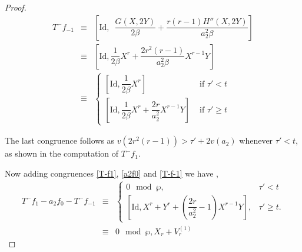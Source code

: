 \documentclass[11pt, reqno]{amsart}
\numberwithin{equation}{section}
\theoremstyle{definition}
\theoremstyle{remark}
\theoremstyle{definition}
\theoremstyle{remark}
\theoremstyle{remark}
\begin{document}
\begin{proof}
\begin{eqnarray}
T^-f_{-1} & \equiv&
\left[\mathrm{Id},\enspace\dfrac{G(X,2Y)}{2\beta}+\dfrac{r(r-1)H''(X,2Y)}{a_2^2\beta}\right]\nonumber\\
  &\equiv& \left[\mathrm{Id},\dfrac{1}{2\beta}X^r+\dfrac{2r^2(r-1)}{a_2^2\beta}X^{r-1}Y\right] \nonumber\\  & \equiv & \begin{cases}
      \left[\mathrm{Id},\dfrac{1}{2\beta}X^r\right] &  \text{ if }\tau'<t \\
\left[\mathrm{Id},\dfrac{1}{2\beta}X^r+\dfrac{2r}{a_2^2}X^{r-1}Y\right]& \text{ if }\tau'\geq t
  \end{cases}
  \end{eqnarray}
  
The last congruence follows as $v(2r^2(r-1))>\tau'+2v(a_2)$ whenever $\tau'<t$, as shown in the computation of $T^-f_{1}$. 

Now adding congruences \eqref{T-f1}, \eqref{a2f0} and \eqref{T-f-1} we have ,
\begin{eqnarray}
   T^-f_1-a_2f_0-T^-f_{-1}&\equiv&
   \begin{cases}
       0\mod\wp, &\tau'<t\\
       \left[\mathrm{Id}, X^r+Y^r+\left(\dfrac{2r}{a_{2}^2}-1\right)X^{r-1}Y \right], &\tau'\geq t.
       \end{cases}\nonumber \\
   &\equiv & 0 \mod \wp, X_{r}+V_{r}^{(1)}
\end{eqnarray}


\end{proof}
\end{document}
